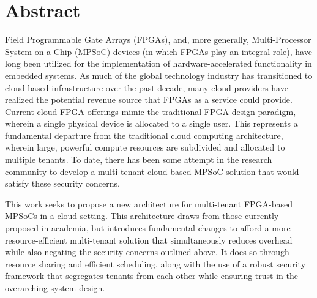 
\pagestyle{empty}
\chapter{Abstract}\label{ch:abstract}

Field Programmable Gate Arrays (FPGAs), and, more generally, Multi-Processor System on a Chip (MPSoC) devices (in which FPGAs play an integral role), have long been utilized for the implementation of hardware-accelerated functionality in embedded systems. As much of the global technology industry has transitioned to cloud-based infrastructure over the past decade, many cloud providers have realized the potential revenue source that FPGAs as a service could provide. Current cloud FPGA offerings mimic the traditional FPGA design paradigm, wherein a single physical device is allocated to a single user. This represents a fundamental departure from the traditional cloud computing architecture, wherein large, powerful compute resources are subdivided and allocated to multiple tenants. To date, there has been some attempt in the research community to develop a multi-tenant cloud based MPSoC solution that would satisfy these security concerns. 


This work seeks to propose a new architecture for multi-tenant FPGA-based MPSoCs in a cloud setting. This architecture draws from those currently proposed in academia, but introduces fundamental changes to afford a more resource-efficient multi-tenant solution that simultaneously reduces overhead while also negating the security concerns outlined above. It does so through resource sharing and efficient scheduling, along with the use of a robust security framework that segregates tenants from each other while ensuring trust in the overarching system design.

